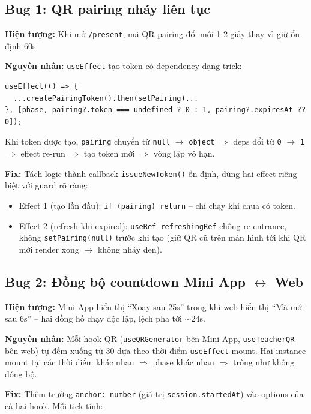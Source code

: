 \documentclass{article}
\begin{document}
\subsection{Bug 1: QR pairing nháy liên tục}

\textbf{Hiện tượng:} Khi mở \texttt{/present}, mã QR pairing đổi mỗi 1-2 giây thay vì giữ ổn định 60s.

\textbf{Nguyên nhân:} \texttt{useEffect} tạo token có dependency dạng trick:

\begin{verbatim}
useEffect(() => {
  ...createPairingToken().then(setPairing)...
}, [phase, pairing?.token === undefined ? 0 : 1, pairing?.expiresAt ?? 0]);
\end{verbatim}

Khi token được tạo, \texttt{pairing} chuyển từ \texttt{null} $\to$ \texttt{object} $\Rightarrow$ deps đổi từ \texttt{0} $\to$ \texttt{1} $\Rightarrow$ effect re-run $\Rightarrow$ tạo token mới $\Rightarrow$ vòng lặp vô hạn.

\textbf{Fix:} Tách logic thành callback \texttt{issueNewToken()} ổn định, dùng hai effect riêng biệt với guard rõ ràng:

\begin{itemize}[leftmargin=1.5em]
  \item Effect 1 (tạo lần đầu): \texttt{if (pairing) return} -- chỉ chạy khi chưa có token.
  \item Effect 2 (refresh khi expired): \texttt{useRef refreshingRef} chống re-entrance, không \texttt{setPairing(null)} trước khi tạo (giữ QR cũ trên màn hình tới khi QR mới render xong $\to$ không nháy đen).
\end{itemize}

\subsection{Bug 2: Đồng bộ countdown Mini App $\leftrightarrow$ Web}

\textbf{Hiện tượng:} Mini App hiển thị ``Xoay sau 25s'' trong khi web hiển thị ``Mã mới sau 6s'' -- hai đồng hồ chạy độc lập, lệch pha tới $\sim$24s.

\textbf{Nguyên nhân:} Mỗi hook QR (\texttt{useQRGenerator} bên Mini App, \texttt{useTeacherQR} bên web) tự đếm xuống từ 30 dựa theo thời điểm \texttt{useEffect} mount. Hai instance mount tại các thời điểm khác nhau $\Rightarrow$ phase khác nhau $\Rightarrow$ trông như không đồng bộ.

\textbf{Fix:} Thêm trường \texttt{anchor: number} (giá trị \texttt{session.startedAt}) vào options của cả hai hook. Mỗi tick tính:
\end{document}
